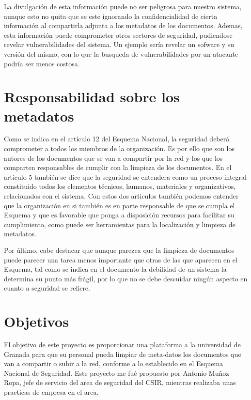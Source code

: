 La divulgación de esta información puede no ser peligrosa para nuestro sistema, aunque esto no quita que se este
ignorando la confidencialidad de cierta información al compartirla adjunta a los metadatos de los documentos. Ademas, 
esta información puede comprometer otros sectores de seguridad, pudiendose revelar vulnerabilidades del sistema. Un 
ejemplo sería revelar un sofware y su versión del mismo, con lo que la busqueda de vulnerabilidades por un atacante 
podría ser menos costosa.


\section{Responsabilidad sobre los metadatos}

Como se indica en el artículo 12 del Esquema Nacional, la seguridad deberá comprometer a todos los miembros de la 
organización. Es por ello que son los autores de los documentos que se van a compartir por la red y los que los 
comparten responsables de cumplir con la limpieza de los documentos. En el articulo 5 también se dice que la seguridad 
se entendera como un proceso integral constituido todos los elementos técnicos, humanos, materiales y organizativos, 
relacionados con el sistema. Con estos dos articulos también podemos entender que la organización en si también es en 
parte responsable de que se cumpla el Esquema y que es favorable que ponga a disposición recursos para facilitar su 
cumplimiento, como puede ser herramientas para la localización y limpieza de
metadatos.

Por último, cabe destacar que aunque parezca que la limpieza de documentos puede parecer una tarea menos importante que 
otras de las que aparecen en el Esquema, tal como se indica en el documento la debilidad de un sistema la determina su 
punto más frágil, por lo que no se debe descuidar ningún aspecto en cuanto a seguridad se refiere.


\section{Objetivos}

El objetivo de este proyecto es proporcionar una plataforma a la universidad de Granada para que su
personal pueda limpiar de meta-datos los documentos que van a compartir o subir a la red, conforme a lo establecido
en el Esquema Nacional de Seguridad. Este proyecto me fué propuesto por Antonio Muñoz Ropa, jefe de servicio del area
de seguridad del CSIR, mientras realizaba unas practicas de empresa en el area.

